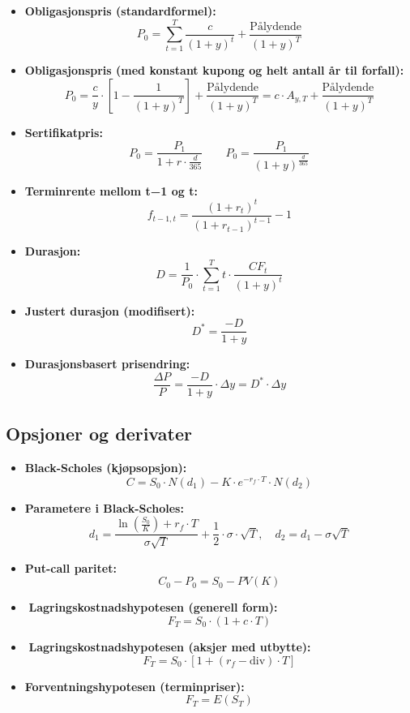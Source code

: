 \documentclass[
  11pt,
  a4paper,
]{article}
\begin{document}
\begin{itemize}
\item
  \textbf{Obligasjonspris (standardformel):}\\
  \[
  P_0 = \sum_{t = 1}^{T} \frac{c}{(1 + y)^t} + \frac{\text{Pålydende}}{(1 + y)^T}
  \]
\item
  \textbf{Obligasjonspris (med konstant kupong og helt antall år til
  forfall):}\\
  \[
  P_0 = \frac{c}{y} \cdot \left[1 - \frac{1}{(1+y)^T}\right] + \frac{\text{Pålydende}}{(1+y)^T} = c \cdot A_{y,T} + \frac{\text{Pålydende}}{(1+y)^T}
  \]
\item
  \textbf{Sertifikatpris:}\\
  \[
  P_0 = \frac{P_1}{1 + r \cdot \frac{d}{365}} \quad \quad P_0 = \frac{P_1}{(1 + y)^{\frac{d}{365}}}
  \]
\item
  \textbf{Terminrente mellom t−1 og t:}\\
  \[
  f_{t-1,t} = \frac{(1 + r_t)^t}{(1 + r_{t-1})^{t-1}} - 1
  \]
\item
  \textbf{Durasjon:}\\
  \[
  D = \frac{1}{P_0} \cdot \sum_{t = 1}^{T} t \cdot \frac{CF_t}{(1 + y)^t}
  \]
\item
  \textbf{Justert durasjon (modifisert):}\\
  \[
  D^* = \frac{-D}{1 + y}
  \]
\item
  \textbf{Durasjonsbasert prisendring:}\\
  \[
  \frac{\Delta P}{P} =  \frac{-D}{1 + y} \cdot \Delta y = D^* \cdot \Delta y
   \]
\end{itemize}

\subsection{Opsjoner og derivater}\label{opsjoner-og-derivater}

\begin{itemize}
\item
  \textbf{Black-Scholes (kjøpsopsjon):}\\
  \[
  C = S_0 \cdot N(d_1) - K \cdot e^{-r_f \cdot T} \cdot N(d_2)
  \]
\item
  \textbf{Parametere i Black-Scholes:}\\
  \[
  d_1 = \frac{\ln \left( \frac{S_0}{K} \right) + r_f \cdot T}{\sigma \sqrt{T}} + \frac{1}{2} \cdot \sigma \cdot \sqrt{T}, \quad
  d_2 = d_1 - \sigma \sqrt{T}
  \]
\item
  \textbf{Put-call paritet:}\\
  \[
  C_0 - P_0 = S_0 - PV(K)
  \]
\item
  ️ \textbf{Lagringskostnadshypotesen (generell form):}\\
  \[
  F_T = S_0 \cdot (1 + c \cdot T)
  \]
\item
  ️ \textbf{Lagringskostnadshypotesen (aksjer med utbytte):}\\
  \[
  F_T = S_0 \cdot \left[1 + (r_f - \text{div}) \cdot T\right]
  \]
\item
  \textbf{Forventningshypotesen (terminpriser):}\\
  \[
  F_T = E(S_T)
  \]
\end{itemize}
\end{document}
